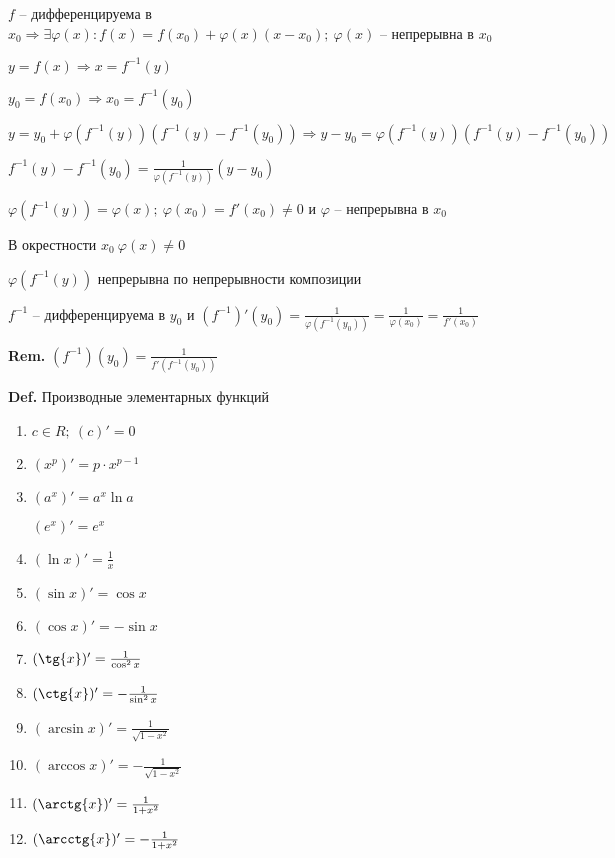 \documentclass[14pt, letter paper]{article}
\begin{document}
$f$ -- дифференцируема в $x_0 \Rightarrow \exists \varphi(x) : f(x) = f(x_0) + \varphi(x)(x - x_0);\ \varphi(x)$ -- непрерывна в $x_0$

$y = f(x) \Rightarrow x = f^{-1}(y)$

$y_0 = f(x_0) \Rightarrow x_0 = f^{-1}(y_0)$

$y = y_0 + \varphi(f^{-1}(y))(f^{-1}(y) - f^{-1}(y_0)) \Rightarrow y - y_0 = \varphi(f^{-1}(y))(f^{-1}(y) - f^{-1}(y_0))$

$f^{-1}(y) - f^{-1}(y_0) = \frac{1}{\varphi(f^{-1}(y))}(y - y_0)$

$\varphi(f^{-1}(y)) = \varphi(x);\ \varphi(x_0) = f'(x_0) \neq 0$ и $\varphi$ -- непрерывна в $x_0$

В окрестности $x_0\ \varphi(x) \neq 0$

$\varphi(f^{-1}(y))$ непрерывна по непрерывности композиции

$f^{-1}$ -- дифференцируема в $y_0$ и $(f^{-1})'(y_0) = \frac{1}{\varphi(f^{-1}(y_0))} = \frac{1}{\varphi(x_0)} = \frac{1}{f'(x_0)}$

\vspace{5mm}

\textbf{Rem.} $(f^{-1})(y_0) = \frac{1}{f'(f^{-1}(y_0))}$

\vspace{5mm}

\textbf{Def.} Производные элементарных функций

\begin{enumerate}
    \item $c \in R;\ (c)' = 0$
    \item $(x^p)' = p \cdot x^{p-1}$
    \item $(a^x)' = a^x \ln{a}$
    
    $(e^x)' = e^x$
    \item $(\ln{x})' = \frac{1}{x}$
    \item $(\sin{x})' = \cos{x}$
    \item $(\cos{x})' = -\sin{x}$
    \item $(\tg{x})' = \frac{1}{\cos^2{x}}$
    \item $(\ctg{x})' = - \frac{1}{\sin^2{x}}$
    \item $(\arcsin{x})' = \frac{1}{\sqrt{1 - x^2}}$
    \item $(\arccos{x})' = - \frac{1}{\sqrt{1 - x^2}}$
    \item $(\arctg{x})' = \frac{1}{1 + x^2}$
    \item $(\arcctg{x})' = - \frac{1}{1 + x^2}$
\end{enumerate}
\end{document}
